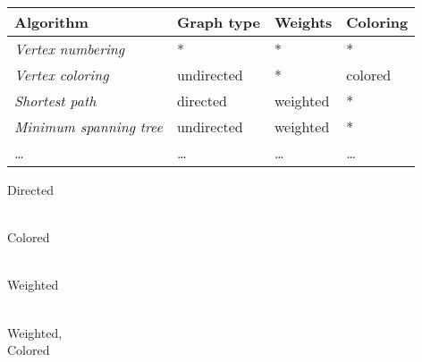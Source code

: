 \begin{frame}{\myframetitle}
	\begin{fancycolumns}[columns=4,widths={65,5,15,15},animation=none]
		\begin{tabular}{llll}
			\toprule
			{\bf Algorithm} 							& {\bf Graph type} 	& {\bf Weights} & {\bf Coloring}  \\ \midrule
			{\em Vertex numbering}			  & *          				& *        			& *         			\\
			{\em Vertex coloring}       	& undirected 				& *        			& colored   			\\
			{\em Shortest path}        		& directed   				& weighted 			& *         			\\
			{\em Minimum spanning tree} 	& undirected 				& weighted 			& *         			\\
			\ldots         					& \ldots 			 			& \ldots 		  	& \ldots 					\\ \bottomrule
		\end{tabular}
		\vspace{5mm}	
	\nextcolumn
	\nextcolumn
		\begin{exampletight}{Directed\\~}
		\end{exampletight}	
		\begin{exampletight}{Colored\\~}
		\end{exampletight}
	\nextcolumn
		\begin{exampletight}{Weighted\\~}
		\end{exampletight}
		\begin{exampletight}{Weighted,\\Colored}
		\end{exampletight}
	\end{fancycolumns}
\end{frame}
